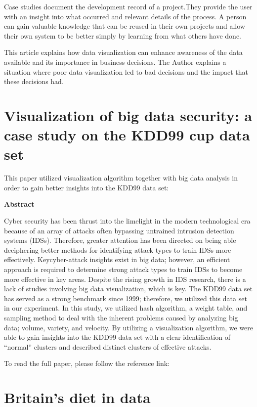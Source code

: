 \documentclass[]{book}
\theoremstyle{definition}
\theoremstyle{definition}
\theoremstyle{definition}
\theoremstyle{remark}
\begin{document}
Case studies document the development record of a project.They provide
the user with an insight into what occurred and relevant details of the
process. A person can gain valuable knowledge that can be reused in
their own projects and allow their own system to be better simply by
learning from what others have done.

This article explains how data visualization can enhance awareness of
the data available and its importance in business decisions. The Author
explains a situation where poor data visualization led to bad decisions
and the impact that these decisions had.

\section{Visualization of big data security: a case study on the KDD99
cup data
set}\label{visualization-of-big-data-security-a-case-study-on-the-kdd99-cup-data-set}

This paper utilized visualization algorithm together with big data
analysis in order to gain better insights into the KDD99 data set:

\textbf{Abstract}

Cyber security has been thrust into the limelight in the modern
technological era because of an array of attacks often bypassing
untrained intrusion detection systems (IDSs). Therefore, greater
attention has been directed on being able deciphering better methods for
identifying attack types to train IDSs more effectively. Keycyber-attack
insights exist in big data; however, an efficient approach is required
to determine strong attack types to train IDSs to become more effective
in key areas. Despite the rising growth in IDS research, there is a lack
of studies involving big data visualization, which is key. The KDD99
data set has served as a strong benchmark since 1999; therefore, we
utilized this data set in our experiment. In this study, we utilized
hash algorithm, a weight table, and sampling method to deal with the
inherent problems caused by analyzing big data; volume, variety, and
velocity. By utilizing a visualization algorithm, we were able to gain
insights into the KDD99 data set with a clear identification of
``normal'' clusters and described distinct clusters of effective
attacks.

To read the full paper, please follow the reference link: \citep{KDD99}

\section{Britain's diet in data}\label{britains-diet-in-data}
\end{document}
